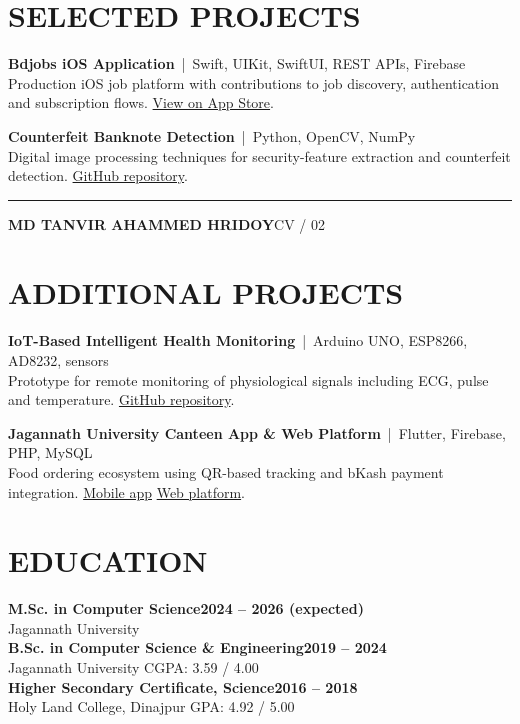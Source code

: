 \documentclass[a4paper,10pt]{article}
\newcommand{\metatxt}[1]{{\small\color{textgray}#1}}
\newcommand{\position}[3]{\textbf{\color{navy}#1}\hfill{\small\color{green}\textbf{#3}}\\[-2pt]\metatxt{#2}\\[-1pt]}
\newcommand{\project}[3]{\textbf{\color{navy}#1} \metatxt{\,|\, #2}\\[-1pt]{\small #3}\par\vspace{4pt}}
\begin{document}
\section{SELECTED PROJECTS}
\project{Bdjobs iOS Application}{Swift, UIKit, SwiftUI, REST APIs, Firebase}{Production iOS job platform with contributions to job discovery, authentication and subscription flows. \href{https://apps.apple.com/in/app/bdjobs/id1435728822}{View on App Store}.}
\project{Counterfeit Banknote Detection}{Python, OpenCV, NumPy}{Digital image processing techniques for security-feature extraction and counterfeit detection. \href{https://github.com/Tanvir180/Fake_Note_Detection_of_Bangladesh}{GitHub repository}.}

\newpage
{\color{green}\rule{\linewidth}{2pt}}\vspace{9pt}
{\bfseries\large\color{navy} MD TANVIR AHAMMED HRIDOY}\hfill{\small\color{textgray}CV / 02}

\section{ADDITIONAL PROJECTS}
\project{IoT-Based Intelligent Health Monitoring}{Arduino UNO, ESP8266, AD8232, sensors}{Prototype for remote monitoring of physiological signals including ECG, pulse and temperature. \href{https://github.com/Tanvir180/IOT_Based_Health_Monitoring_System}{GitHub repository}.}
\project{Jagannath University Canteen App \& Web Platform}{Flutter, Firebase, PHP, MySQL}{Food ordering ecosystem using QR-based tracking and bKash payment integration. \href{https://github.com/Tanvir180/Jagannath_University_Canteen}{Mobile app} \textbar{} \href{https://github.com/Tanvir180/Canteen-Automation-System}{Web platform}.}

\section{EDUCATION}
\position{M.Sc. in Computer Science}{Jagannath University}{2024 -- 2026 (expected)}
\vspace{3pt}
\position{B.Sc. in Computer Science \& Engineering}{Jagannath University \textbar{} CGPA: 3.59 / 4.00}{2019 -- 2024}
\vspace{3pt}
\position{Higher Secondary Certificate, Science}{Holy Land College, Dinajpur \textbar{} GPA: 4.92 / 5.00}{2016 -- 2018}
\end{document}
